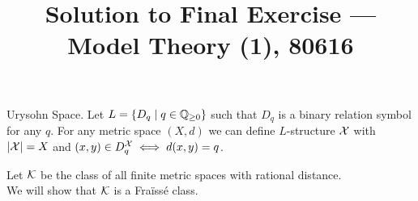 
\title{Solution to Final Exercise --- Model Theory (1), 80616}

\DeclareMathOperator{\age}{Age}
\DeclareMathOperator{\acl}{acl}


\maketitle
\maketitleprint[yellow]

\question{}
Urysohn Space.
Let $L = \{ D_q \mid q \in \mathbb{Q}_{\ge 0} \}$ such that $D_q$ is a binary relation symbol for any $q$.
For any metric space $(X, d)$ we can define $L$-structure $\mathcal{X}$ with $|\mathcal{X}| = X$ and $(x, y) \in D_q^{\mathcal{X}} \iff d(x, y) = q$.

\subquestion{}
Let $\mathcal{K}$ be the class of all finite metric spaces with rational distance. \\
We will show that $\mathcal{K}$ is a Fraïssé class.

